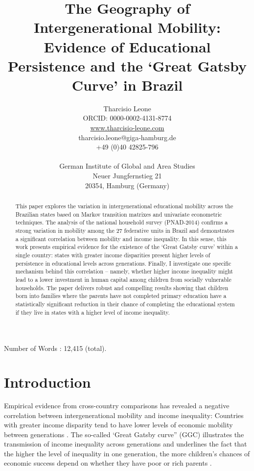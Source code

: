 \documentclass[a4paper, 12pt]{article}
\title{The Geography of Intergenerational Mobility: \\ \normalsize Evidence of Educational Persistence and the ‘Great Gatsby Curve’ in Brazil}
\author{Tharcisio Leone \\ \normalsize ORCID: 0000-0002-4131-8774 \\ \normalsize \href{www.tharcisio-leone.com}{www.tharcisio-leone.com} \\ \normalsize tharcisio.leone@giga-hamburg.de\\ \normalsize +49 (0)40 42825-796 \\ \\ \normalsize German Institute of Global and Area Studies \\ \normalsize Neuer Jungfernstieg 21 \\ \normalsize 20354, Hamburg (Germany)}
\let\footnote=\endnote
\let\ACMmaketitle=\maketitle
\renewcommand{\maketitle}{\begingroup\let\footnote=\thanks \ACMmaketitle\endgroup}
\begin{document}
\maketitle

\begin{abstract}
This paper explores the variation in intergenerational educational mobility across the Brazilian states based on Markov transition matrixes and univariate econometric techniques. The analysis of the national household survey (PNAD-2014) confirms a strong variation in mobility among the 27 federative units in Brazil and demonstrates a significant correlation between mobility and income inequality. In this sense, this work presents empirical evidence for the existence of the ‘Great Gatsby curve’ within a single country: states with greater income disparities present higher levels of persistence in educational levels across generations. Finally, I investigate one specific mechanism behind this correlation – namely, whether higher income inequality might lead to a lower investment in human capital among children from socially vulnerable households. The paper delivers robust and compelling results showing that children born into families where the parents have not completed primary education  have a statistically significant reduction in their chance of completing the educational system if they live in states with a higher level of income inequality.

\end{abstract}

\hfill \break 
\thispagestyle{empty}
Number of Words : 12,415 (total).




\newpage

\section{Introduction}

Empirical evidence from cross-country comparisons has revealed a negative correlation between intergenerational mobility and income inequality: Countries with greater income disparity tend to have lower levels of economic mobility between generations \citep{corak2006poor, bjorklund2009intergenerational, blanden2013cross}. The so-called ‘Great Gatsby curve” (GGC) illustrates the transmission of income inequality across generations and underlines the fact that the higher the level of inequality in one generation, the more children’s chances of economic success depend on whether they have poor or rich parents \citep{corak2013income, boudreaux2014jumping, jerrim2015income}.
 
\end{document}

